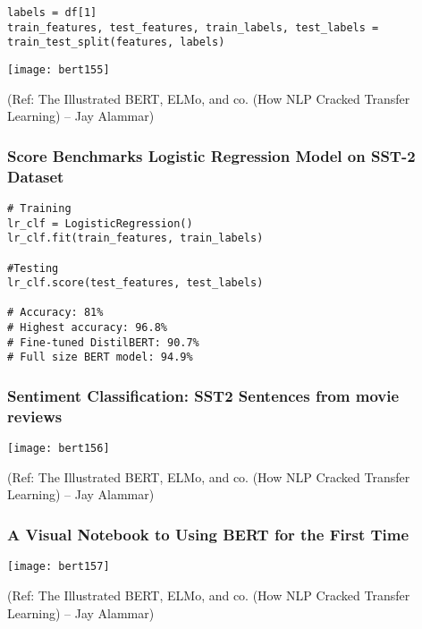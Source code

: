 \begin{frame}[fragile]\frametitle{}

\begin{lstlisting}
labels = df[1]
train_features, test_features, train_labels, test_labels = train_test_split(features, labels)
\end{lstlisting}


			\begin{center}
			\texttt{[image: bert155]}
			\end{center}	

{\tiny (Ref: The Illustrated BERT, ELMo, and co. (How NLP Cracked Transfer Learning) – Jay Alammar)}

\end{frame}

\begin{frame}[fragile]\frametitle{Score Benchmarks Logistic Regression Model on SST-2 Dataset }

\begin{lstlisting}
# Training
lr_clf = LogisticRegression() 
lr_clf.fit(train_features, train_labels)

#Testing
lr_clf.score(test_features, test_labels)

# Accuracy: 81%
# Highest accuracy: 96.8%
# Fine-tuned DistilBERT: 90.7%
# Full size BERT model: 94.9%
\end{lstlisting}



\end{frame}

\begin{frame}[fragile]\frametitle{Sentiment Classification: SST2 Sentences from movie reviews}

			\begin{center}
			\texttt{[image: bert156]}
			\end{center}	

{\tiny (Ref: The Illustrated BERT, ELMo, and co. (How NLP Cracked Transfer Learning) – Jay Alammar)}

\end{frame}

\begin{frame}[fragile]\frametitle{A Visual Notebook to Using BERT for the First Time }

			\begin{center}
			\texttt{[image: bert157]}
			\end{center}	

{\tiny (Ref: The Illustrated BERT, ELMo, and co. (How NLP Cracked Transfer Learning) – Jay Alammar)}

\end{frame}

